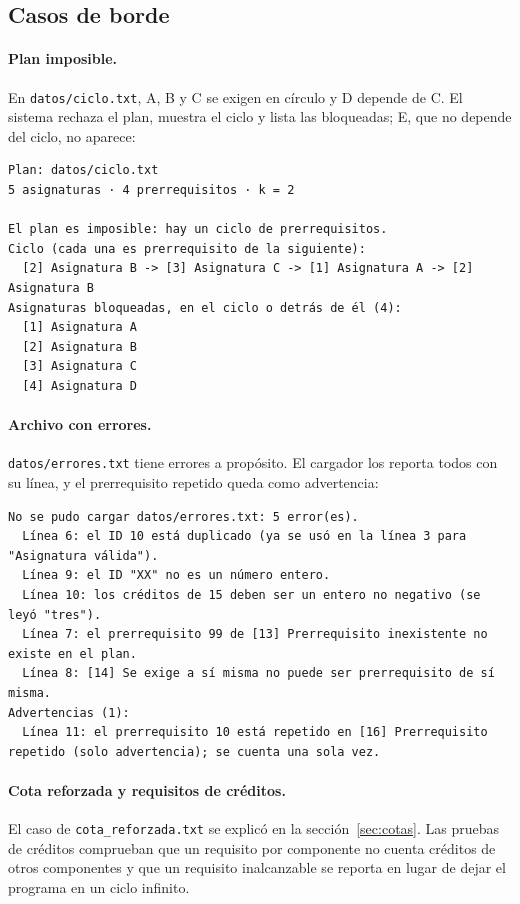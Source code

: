 \documentclass[11pt,letterpaper]{article}
\begin{document}
\subsection{Casos de borde}\label{sec:bordes}
\paragraph{Plan imposible.} En \texttt{datos/ciclo.txt}, A, B y C se exigen en círculo y D depende de C. El sistema rechaza el plan, muestra el ciclo y lista las bloqueadas; E, que no depende del ciclo, no aparece:
\begin{lstlisting}[style=consola]
Plan: datos/ciclo.txt
5 asignaturas · 4 prerrequisitos · k = 2

El plan es imposible: hay un ciclo de prerrequisitos.
Ciclo (cada una es prerrequisito de la siguiente):
  [2] Asignatura B -> [3] Asignatura C -> [1] Asignatura A -> [2] Asignatura B
Asignaturas bloqueadas, en el ciclo o detrás de él (4):
  [1] Asignatura A
  [2] Asignatura B
  [3] Asignatura C
  [4] Asignatura D
\end{lstlisting}

\paragraph{Archivo con errores.} \texttt{datos/errores.txt} tiene errores a propósito. El cargador los reporta todos con su línea, y el prerrequisito repetido queda como advertencia:
\begin{lstlisting}[style=consola]
No se pudo cargar datos/errores.txt: 5 error(es).
  Línea 6: el ID 10 está duplicado (ya se usó en la línea 3 para "Asignatura válida").
  Línea 9: el ID "XX" no es un número entero.
  Línea 10: los créditos de 15 deben ser un entero no negativo (se leyó "tres").
  Línea 7: el prerrequisito 99 de [13] Prerrequisito inexistente no existe en el plan.
  Línea 8: [14] Se exige a sí misma no puede ser prerrequisito de sí misma.
Advertencias (1):
  Línea 11: el prerrequisito 10 está repetido en [16] Prerrequisito repetido (solo advertencia); se cuenta una sola vez.
\end{lstlisting}

\paragraph{Cota reforzada y requisitos de créditos.} El caso de \texttt{cota\_reforzada.txt} se explicó en la sección~\ref{sec:cotas}. Las pruebas de créditos comprueban que un requisito por componente no cuenta créditos de otros componentes y que un requisito inalcanzable se reporta en lugar de dejar el programa en un ciclo infinito.
\end{document}
